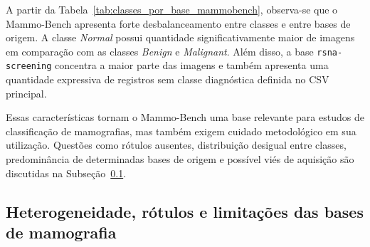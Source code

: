 \documentclass[
    12pt,
    openright,
    oneside,
    a4paper,
    english,
    brazil
]{abntex2}
\begin{document}
\begin{table}[H]
\centering
\caption{Distribuição das classes por base de origem no CSV principal do Mammo-Bench}
\label{tab:classes_por_base_mammobench}
\end{table}

A partir da Tabela~\ref{tab:classes_por_base_mammobench}, observa-se que o Mammo-Bench apresenta forte desbalanceamento entre classes e entre bases de origem. A classe \textit{Normal} possui quantidade significativamente maior de imagens em comparação com as classes \textit{Benign} e \textit{Malignant}. Além disso, a base \texttt{rsna-screening} concentra a maior parte das imagens e também apresenta uma quantidade expressiva de registros sem classe diagnóstica definida no CSV principal.

Essas características tornam o Mammo-Bench uma base relevante para estudos de classificação de mamografias, mas também exigem cuidado metodológico em sua utilização. Questões como rótulos ausentes, distribuição desigual entre classes, predominância de determinadas bases de origem e possível viés de aquisição são discutidas na Subseção~\ref{subsec:heterogeneidade_rotulos_limitacoes_bases}.



\subsection{Heterogeneidade, rótulos e limitações das bases de mamografia}
\label{subsec:heterogeneidade_rotulos_limitacoes_bases}
\end{document}
